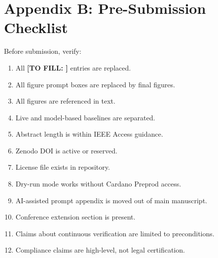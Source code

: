 \documentclass[journal]{IEEEtran}
\newcommand{\TOFILL}[1]{\textbf{[TO FILL: #1]}}
\begin{document}
\section*{Appendix B: Pre-Submission Checklist}

Before submission, verify:
\begin{enumerate}[nosep,leftmargin=2em]
    \item All \TOFILL{} entries are replaced.
    \item All figure prompt boxes are replaced by final figures.
    \item All figures are referenced in text.
    \item Live and model-based baselines are separated.
    \item Abstract length is within IEEE Access guidance.
    \item Zenodo DOI is active or reserved.
    \item License file exists in repository.
    \item Dry-run mode works without Cardano Preprod access.
    \item AI-assisted prompt appendix is moved out of main manuscript.
    \item Conference extension section is present.
    \item Claims about continuous verification are limited to preconditions.
    \item Compliance claims are high-level, not legal certification.
\end{enumerate}
\end{document}
